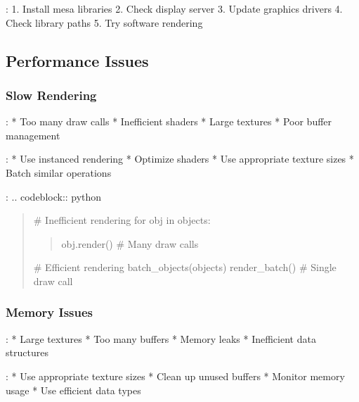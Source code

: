 \documentclass[a4paper,10pt,english,openany,oneside]{sphinxmanual}
\begin{document}
\sphinxAtStartPar
{}:
1. Install mesa libraries
2. Check display server
3. Update graphics drivers
4. Check library paths
5. Try software rendering


\subsection{Performance Issues}
\label{\detokenize{troubleshooting:performance-issues}}

\subsubsection{Slow Rendering}
\label{\detokenize{troubleshooting:slow-rendering}}
\sphinxAtStartPar
{}:
* Too many draw calls
* Inefficient shaders
* Large textures
* Poor buffer management

\sphinxAtStartPar
{}:
* Use instanced rendering
* Optimize shaders
* Use appropriate texture sizes
* Batch similar operations

\sphinxAtStartPar
{}:
.. code\sphinxhyphen{}block:: python
\begin{quote}

\sphinxAtStartPar
\# Inefficient rendering
for obj in objects:
\begin{quote}

\sphinxAtStartPar
obj.render()  \# Many draw calls
\end{quote}

\sphinxAtStartPar
\# Efficient rendering
batch\_objects(objects)
render\_batch()  \# Single draw call
\end{quote}


\subsubsection{Memory Issues}
\label{\detokenize{troubleshooting:memory-issues}}
\sphinxAtStartPar
{}:
* Large textures
* Too many buffers
* Memory leaks
* Inefficient data structures

\sphinxAtStartPar
{}:
* Use appropriate texture sizes
* Clean up unused buffers
* Monitor memory usage
* Use efficient data types
\end{document}
